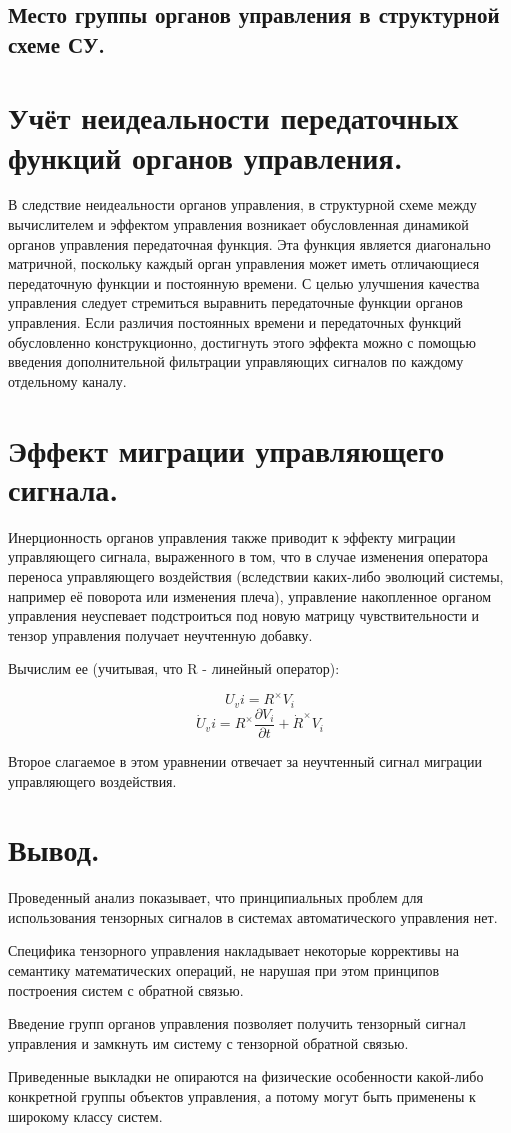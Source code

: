 \documentclass[a4paper]{article}
\begin{document}
\subsection{Место группы органов управления в структурной схеме СУ.}

\section{Учёт неидеальности передаточных функций органов управления.}
В следствие неидеальности органов управления, в структурной схеме между вычислителем и эффектом управления возникает обусловленная динамикой органов управления передаточная функция. Эта функция является диагонально матричной, поскольку каждый орган управления может иметь отличающиеся передаточную функции и постоянную времени. С целью улучшения качества управления следует стремиться выравнить передаточные функции органов управления. Если различия постоянных времени и передаточных функций обусловленно конструкционно, достигнуть этого эффекта можно с помощью введения дополнительной фильтрации управляющих сигналов по каждому отдельному каналу.

\section{Эффект миграции управляющего сигнала.}
Инерционность органов управления также приводит к эффекту миграции управляющего сигнала, выраженного в том, что в случае изменения оператора переноса управляющего воздействия (вследствии каких-либо эволюций системы, например её поворота или изменения плеча), управление накопленное органом управления неуспевает подстроиться под новую матрицу чувствительности и тензор управления получает неучтенную добавку.

Вычислим ее (учитывая, что R - линейный оператор):

\begin{equation}U_vi = R^\times V_i\end{equation}
\begin{equation}\dot{U}_vi = R^\times \frac{\partial{V_i}}{\partial{t}} + \dot{R}^\times V_i\end{equation}

Второе слагаемое в этом уравнении отвечает за неучтенный сигнал миграции управляющего воздействия.  

\section{Вывод.}
Проведенный анализ показывает, что принципиальных проблем для использования тензорных сигналов в системах автоматического управления нет. 

Специфика тензорного управления накладывает некоторые коррективы на семантику математических операций, не нарушая при этом принципов построения систем с обратной связью.

Введение групп органов управления позволяет получить тензорный сигнал управления и замкнуть им систему с тензорной обратной связью. 

Приведенные выкладки не опираются на физические особенности какой-либо конкретной группы объектов управления, а потому могут быть применены к широкому классу систем.
\end{document}
